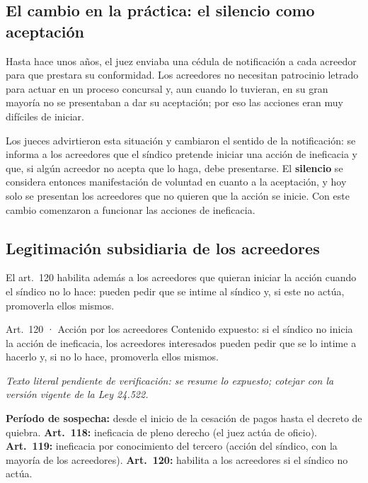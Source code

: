 \documentclass[12pt,oneside]{book}
\begin{document}
\subsection{El cambio en la práctica: el silencio como aceptación}

Hasta hace unos años, el juez enviaba una cédula de notificación a cada acreedor para que prestara su conformidad. Los acreedores no necesitan patrocinio letrado para actuar en un proceso concursal y, aun cuando lo tuvieran, en su gran mayoría no se presentaban a dar su aceptación; por eso las acciones eran muy difíciles de iniciar.

Los jueces advirtieron esta situación y cambiaron el sentido de la notificación: se informa a los acreedores que el síndico pretende iniciar una acción de ineficacia y que, si algún acreedor no acepta que lo haga, debe presentarse. El \textbf{silencio} se considera entonces manifestación de voluntad en cuanto a la aceptación, y hoy solo se presentan los acreedores que no quieren que la acción se inicie. Con este cambio comenzaron a funcionar las acciones de ineficacia.

\subsection{Legitimación subsidiaria de los acreedores}

El art.~120 habilita además a los acreedores que quieran iniciar la acción cuando el síndico no lo hace: pueden pedir que se intime al síndico y, si este no actúa, promoverla ellos mismos.

\begin{norma}{Art.~120 · Acción por los acreedores}
Contenido expuesto: si el síndico no inicia la acción de ineficacia, los acreedores interesados pueden pedir que se lo intime a hacerlo y, si no lo hace, promoverla ellos mismos.

\par\smallskip\textit{Texto literal pendiente de verificación: se resume lo expuesto; cotejar con la versión vigente de la Ley 24.522.}
\end{norma}

\begin{important}
\textbf{Período de sospecha:} desde el inicio de la cesación de pagos hasta el decreto de quiebra. \textbf{Art.~118:} ineficacia de pleno derecho (el juez actúa de oficio). \textbf{Art.~119:} ineficacia por conocimiento del tercero (acción del síndico, con la mayoría de los acreedores). \textbf{Art.~120:} habilita a los acreedores si el síndico no actúa.
\end{important}
\end{document}
